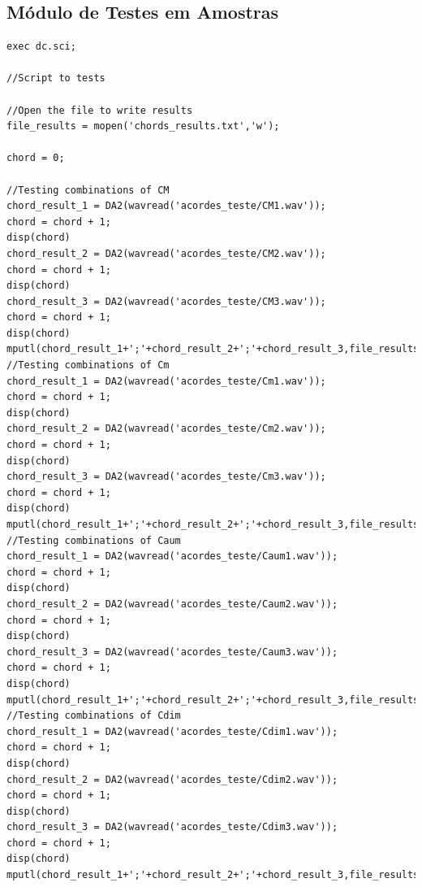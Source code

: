 \begin{apendicesenv}
\section{Módulo de Testes em Amostras}
\label{sec:moduloequalizacao}
\begin{lstlisting} 
exec dc.sci;

//Script to tests

//Open the file to write results
file_results = mopen('chords_results.txt','w');

chord = 0;

//Testing combinations of CM
chord_result_1 = DA2(wavread('acordes_teste/CM1.wav'));
chord = chord + 1;
disp(chord)
chord_result_2 = DA2(wavread('acordes_teste/CM2.wav'));
chord = chord + 1;
disp(chord)
chord_result_3 = DA2(wavread('acordes_teste/CM3.wav'));
chord = chord + 1;
disp(chord)
mputl(chord_result_1+';'+chord_result_2+';'+chord_result_3,file_results);
//Testing combinations of Cm
chord_result_1 = DA2(wavread('acordes_teste/Cm1.wav'));
chord = chord + 1;
disp(chord)
chord_result_2 = DA2(wavread('acordes_teste/Cm2.wav'));
chord = chord + 1;
disp(chord)
chord_result_3 = DA2(wavread('acordes_teste/Cm3.wav'));
chord = chord + 1;
disp(chord)
mputl(chord_result_1+';'+chord_result_2+';'+chord_result_3,file_results);
//Testing combinations of Caum
chord_result_1 = DA2(wavread('acordes_teste/Caum1.wav'));
chord = chord + 1;
disp(chord)
chord_result_2 = DA2(wavread('acordes_teste/Caum2.wav'));
chord = chord + 1;
disp(chord)
chord_result_3 = DA2(wavread('acordes_teste/Caum3.wav'));
chord = chord + 1;
disp(chord)
mputl(chord_result_1+';'+chord_result_2+';'+chord_result_3,file_results);
//Testing combinations of Cdim
chord_result_1 = DA2(wavread('acordes_teste/Cdim1.wav'));
chord = chord + 1;
disp(chord)
chord_result_2 = DA2(wavread('acordes_teste/Cdim2.wav'));
chord = chord + 1;
disp(chord)
chord_result_3 = DA2(wavread('acordes_teste/Cdim3.wav'));
chord = chord + 1;
disp(chord)
mputl(chord_result_1+';'+chord_result_2+';'+chord_result_3,file_results);


\end{lstlisting}
\end{apendicesenv}

